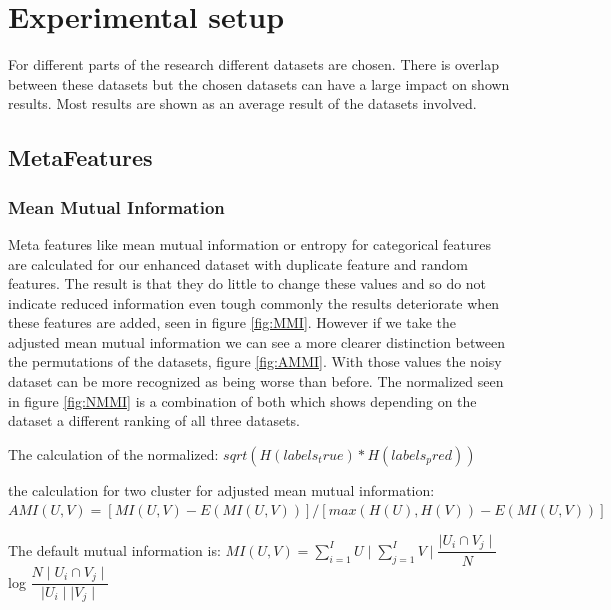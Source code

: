 \documentclass[a4paper,10pt]{article}
\begin{document}
\section{Experimental setup} \label{Chapter3}
For different parts of the research different datasets are chosen. There is overlap between these datasets but the chosen datasets can have a large impact on shown results. Most results are shown as an average result of the datasets involved.

\subsection{MetaFeatures}

\subsubsection{Mean Mutual Information}\label{chapter311}
Meta features like mean mutual information or entropy for categorical features are calculated for our enhanced dataset with duplicate feature and random features. The result is that they do little to change these values and so do not indicate reduced information even tough commonly the results deteriorate when these features are added, seen in figure \ref{fig:MMI}. However if we take the adjusted mean mutual information we can see a more clearer distinction between the permutations of the datasets, figure \ref{fig:AMMI}. With those values the noisy dataset can be more recognized as being worse than before. The normalized seen in figure \ref{fig:NMMI}  is a combination of both which shows depending on the dataset a different ranking of all three datasets.

The calculation of the normalized:
$sqrt(H(labels_true) * H(labels_pred))$


the calculation for two cluster for adjusted mean mutual information:
$AMI(U, V) = [MI(U, V) - E(MI(U, V))] / [max(H(U), H(V)) - E(MI(U, V))]$


The default mutual information is:
$MI(U,V) = \sum_{i = 1}^{I} U \mid\sum_{j = 1}^{I} V \mid \dfrac{\mid U_i \cap V_j\mid}{N} $log $\dfrac{N\mid U_i \cap V_j\mid}{\mid U_i\mid \mid V_j\mid}$
\end{document}
